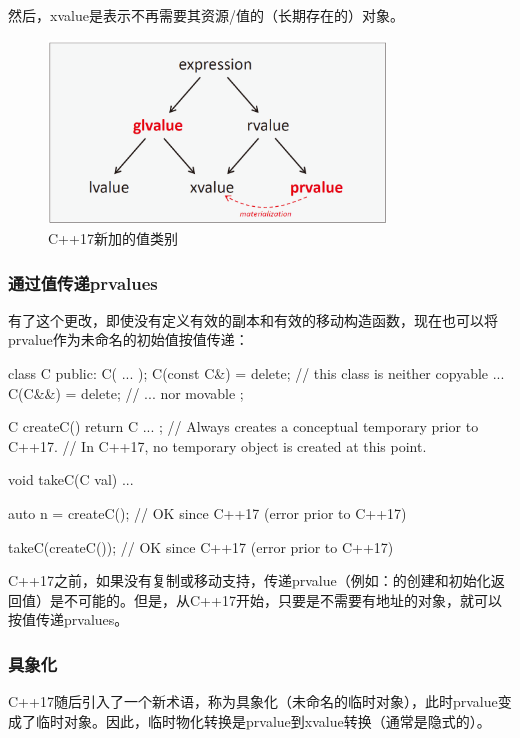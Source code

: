 然后，xvalue是表示不再需要其资源/值的（长期存在的）对象。

\begin{figure}
	\includegraphics[width=0.8\textwidth]{part1/ch8/images/2}
	\caption{C++17新加的值类别}
\end{figure}

\subsubsection{通过值传递prvalues}

有了这个更改，即使没有定义有效的副本和有效的移动构造函数，现在也可以将prvalue作为未命名的初始值按值传递：

\begin{cppcode}
class C {
	public:
	C( ... );
	C(const C&) = delete; // this class is neither copyable ...
	C(C&&) = delete; // ... nor movable
};

C createC() {
	return C{ ... }; // Always creates a conceptual temporary prior to C++17.
} // In C++17, no temporary object is created at this point.

void takeC(C val) {
	...
}

auto n = createC(); // OK since C++17 (error prior to C++17)

takeC(createC()); // OK since C++17 (error prior to C++17)
\end{cppcode}

C++17之前，如果没有复制或移动支持，传递prvalue（例如：的创建和初始化返回值）是不可能的。但是，从C++17开始，只要是不需要有地址的对象，就可以按值传递prvalues。

\subsubsection{具象化}

C++17随后引入了一个新术语，称为具象化（未命名的临时对象），此时prvalue变成了临时对象。因此，临时物化转换是prvalue到xvalue转换（通常是隐式的）。

